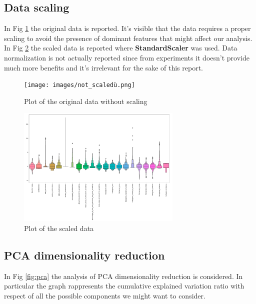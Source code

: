 \documentclass[a4paper,12pt]{article}
\begin{document}
\subsection{Data scaling}
In Fig \ref{fig:notscaled} the original data is reported. It's visible that the data requires a proper scaling to avoid the presence of dominant features that might affect our analysis. In Fig \ref{fig:scaled} the scaled data is reported where \textbf{StandardScaler} was used. Data normalization is not actually reported since from experiments it doesn't provide much more benefits and it's irrelevant for the sake of this report.

\begin{figure}[H]
  \begin{center}
  \texttt{[image: images/not\_scaledù.png]}
  \end{center}
  \caption{Plot of the original data without scaling}
  \label{fig:notscaled}
\end{figure}
\begin{figure}[H]
  \begin{center}
  \includegraphics[width=0.7\textwidth]{images/scaled.png}
  \end{center}
  \caption{Plot of the scaled data}
  \label{fig:scaled}
\end{figure}

\newpage
\subsection{PCA dimensionality reduction}
\bigbreak
\noindent In Fig \ref{fig:pca} the analysis of PCA dimensionality reduction is considered. In particular the graph rappresents the cumulative explained variation ratio with respect of all the possible components we might want to consider.
\end{document}
